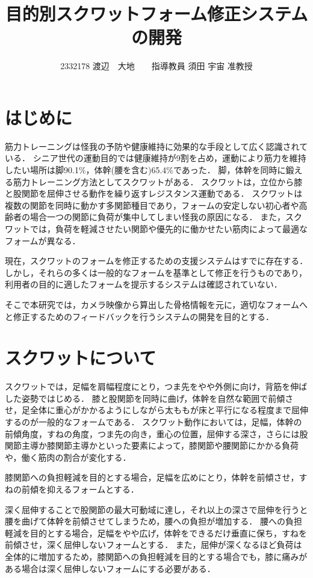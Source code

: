 \documentclass[twocolumn,10pt,a4j]{ltjsarticle}
\title{目的別スクワットフォーム修正システムの開発}
\author{2332178 渡辺　大地　　指導教員 須田 宇宙 准教授}
\date{}
\begin{document}
\maketitle

\section{はじめに}
筋力トレーニングは怪我の予防や健康維持に効果的な手段として広く認識されている．
シニア世代の運動目的では健康維持が9割を占め，運動により筋力を維持したい場所は脚90.1\%，体幹(腰を含む)65.4\%であった\cite{senior}．
脚，体幹を同時に鍛える筋力トレーニング方法としてスクワットがある．
スクワットは，立位から膝と股関節を屈伸させる動作を繰り返すレジスタンス運動である．
スクワットは複数の関節を同時に動かす多関節種目であり，フォームの安定しない初心者や高齢者の場合一つの関節に負荷が集中してしまい怪我の原因になる．
また，スクワットでは，負荷を軽減させたい関節や優先的に働かせたい筋肉によって最適なフォームが異なる．

現在，スクワットのフォームを修正するための支援システムはすでに存在する．
しかし，それらの多くは一般的なフォームを基準として修正を行うものであり，利用者の目的に適したフォームを提示するシステムは確認されていない．

そこで本研究では，カメラ映像から算出した骨格情報を元に，適切なフォームへと修正するためのフィードバックを行うシステムの開発を目的とする．

\section{スクワットについて}
スクワットでは，足幅を肩幅程度にとり，つま先をやや外側に向け，背筋を伸ばした姿勢ではじめる．
膝と股関節を同時に曲げ，体幹を自然な範囲で前傾させ，足全体に重心がかかるようにしながら太ももが床と平行になる程度まで屈伸するのが一般的なフォームである．
スクワット動作においては，足幅，体幹の前傾角度，すねの角度，つま先の向き，重心の位置，屈伸する深さ，さらには股関節主導か膝関節主導かといった要素によって，膝関節や腰関節にかかる負荷や，働く筋肉の割合が変化する\cite{squat}．

膝関節への負担軽減を目的とする場合，足幅を広めにとり，体幹を前傾させ，すねの前傾を抑えるフォームとする．

深く屈伸することで股関節の最大可動域に達し，それ以上の深さで屈伸を行うと腰を曲げて体幹を前傾させてしまうため，腰への負担が増加する．
腰への負担軽減を目的とする場合，足幅をやや広げ，体幹をできるだけ垂直に保ち，すねを前傾させ，深く屈伸しないフォームとする．
また，屈伸が深くなるほど負荷は全体的に増加するため，膝関節への負担軽減を目的とする場合でも，膝に痛みがある場合は深く屈伸しないフォームにする必要がある．
\end{document}
